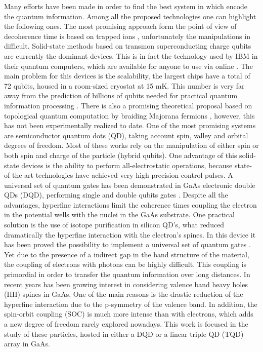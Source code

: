 Many efforts have been made in order to find the best system in which encode the quantum information. Among all the proposed technologies one can highlight the following ones. The most promising approach form the point of view of decoherence time is based on trapped ions \cite{Debnath2016}, unfortunately the manipulations in difficult. Solid-state methods based on transmon superconducting charge qubits are currently the dominant devices. This is in fact the technology used by IBM in their quantum computers, which are available for anyone to use via online \cite{McKay2018}. The main problem for this devices is the scalability, the largest chips have a total of 72 qubits, housed in a room-sized cryostat at 15 mK. This number is very far away from the prediction of billions of qubits needed for practical quantum information processing \cite{Fowler2012}. There is also a promising theoretical proposal based on topological quantum computation by braiding Majorana fermions \cite{Nickerson2013}, however, this has not been experimentally realized to date. One of the most promising systems are semiconductor quantum dots (QD), taking account spin, valley and orbital degrees of freedom. Most of these works rely on the manipulation of either spin or both spin and charge of the particle (hybrid qubits). One advantage of this solid-state devices is the ability to perform all-electrostatic operations, because state-of-the-art technologies have achieved very high precision control pulses. A universal set of quantum gates has been demonstrated in GaAs electronic double QDs (DQD), performing single and double qubits gates \cite{Petta2010,Ribeiro2009}. Despite all the advantages, hyperfine interactions limit the coherence times coupling the electron in the potential wells with the nuclei in the GaAs substrate. One practical solution is the use of isotope purification in silicon QD's, what reduced dramatically the hyperfine interaction with the electron's spines. In this device it has been proved the possibility to implement a universal set of quantum gates \cite{Masuda2018}. Yet due to the presence of a indirect gap in the band structure of the material, the coupling of electrons with photons can be highly difficult. This coupling is primordial in order to transfer the quantum information over long distances. In recent years has been growing interest in considering valence band heavy holes (HH) spines in GaAs. One of the main reasons is the drastic reduction of the hyperfine interaction due to the p-symmetry of the valence band. In addition, the spin-orbit coupling (SOC) is much more intense than with electrons, which adds a new degree of freedom rarely explored nowadays. This work is focused in the study of these particles, hosted in either a DQD or a linear triple QD (TQD) array in GaAs.\\

